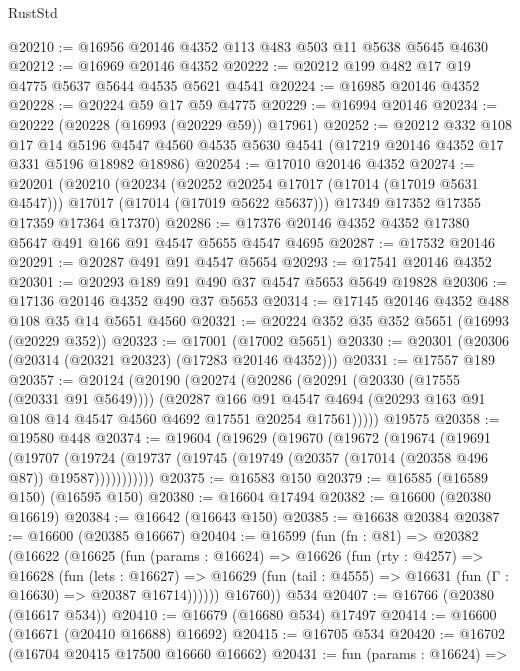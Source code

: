 \begin{lexlean}{RustStd}
\begin{coremodule}
@20210 := @16956 @20146 @4352 @113 @483 @503 @11 @5638 @5645 @4630
@20212 := @16969 @20146 @4352
@20222 := @20212 @199 @482 @17 @19 @4775 @5637 @5644 @4535 @5621 @4541
@20224 := @16985 @20146 @4352
@20228 := @20224 @59 @17 @59 @4775
@20229 := @16994 @20146
@20234 := @20222 (@20228 (@16993 (@20229 @59)) @17961)
@20252 := @20212
    @332
    @108
    @17
    @14
    @5196
    @4547
    @4560
    @4535
    @5630
    @4541
    (@17219 @20146 @4352 @17 @331 @5196 @18982 @18986)
@20254 := @17010 @20146 @4352
@20274 := @20201
    (@20210
      (@20234
        (@20252 @20254 @17017 (@17014 (@17019 @5631 @4547)))
        @17017
        (@17014 (@17019 @5622 @5637)))
      @17349
      @17352
      @17355
      @17359
      @17364
      @17370)
@20286 := @17376 @20146 @4352 @4352 @17380 @5647 @491 @166 @91 @4547 @5655 @4547 @4695
@20287 := @17532 @20146
@20291 := @20287 @491 @91 @4547 @5654
@20293 := @17541 @20146 @4352
@20301 := @20293 @189 @91 @490 @37 @4547 @5653 @5649 @19828
@20306 := @17136 @20146 @4352 @490 @37 @5653
@20314 := @17145 @20146 @4352 @488 @108 @35 @14 @5651 @4560
@20321 := @20224 @352 @35 @352 @5651 (@16993 (@20229 @352))
@20323 := @17001 (@17002 @5651)
@20330 := @20301 (@20306 (@20314 (@20321 @20323) (@17283 @20146 @4352)))
@20331 := @17557 @189
@20357 := @20124
    (@20190
      (@20274
        (@20286
          (@20291 (@20330 (@17555 (@20331 @91 @5649))))
          (@20287
            @166
            @91
            @4547
            @4694
            (@20293 @163 @91 @108 @14 @4547 @4560 @4692 @17551 @20254 @17561)))))
    @19575
@20358 := @19580 @448
@20374 := @19604
    (@19629
      (@19670
        (@19672
          (@19674
            (@19691
              (@19707
                (@19724 (@19737 (@19745 (@19749 (@20357 (@17014 (@20358 @496 @87)) @19587)))))))))))
@20375 := @16583 @150
@20379 := @16585 (@16589 @150) (@16595 @150)
@20380 := @16604 @17494
@20382 := @16600 (@20380 @16619)
@20384 := @16642 (@16643 @150)
@20385 := @16638 @20384
@20387 := @16600 (@20385 @16667)
@20404 := @16599
    (fun (fn : @81) =>
    @20382
      (@16622
        (@16625
          (fun (params : @16624) =>
          @16626
            (fun (rty : @4257) =>
            @16628
              (fun (lets : @16627) =>
              @16629 (fun (tail : @4555) => @16631 (fun (Γ : @16630) => @20387 @16714))))))
        @16760))
    @534
@20407 := @16766 (@20380 (@16617 @534))
@20410 := @16679 (@16680 @534) @17497
@20414 := @16600 (@16671 (@20410 @16688) @16692)
@20415 := @16705 @534
@20420 := @16702 (@16704 @20415 @17500 @16660 @16662)
@20431 := fun (params : @16624) =>

\end{coremodule}
\end{lexlean}
